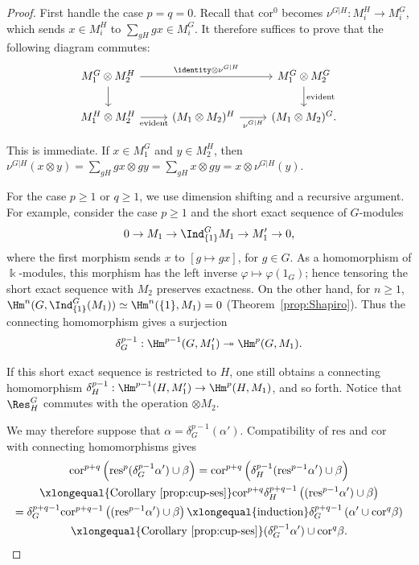 \begin{proof}
	First handle the case $p=q=0$. Recall that $\mathrm{cor}^0$ becomes
	$\nu^{G|H}:M_i^H\to M_i^G$, which sends $x\in M_i^H$ to
	$\sum_{gH}gx\in M_i^G$. It therefore suffices to prove that the following
	diagram commutes:
	\[\begin{tikzcd}
		M_1^G \otimes M_2^H \arrow[rr, "{\identity \otimes \nu^{G|H}}"] \arrow[d] & & M_1^G \otimes M_2^G \arrow[d, "\text{evident}"] \\
		M_1^H \otimes M_2^H \arrow[r, "\text{evident}"'] & (M_1 \otimes M_2)^H \arrow[r, "{\nu^{G|H}}"'] & (M_1 \otimes M_2)^G .
	\end{tikzcd}\]

	This is immediate. If $x\in M_1^G$ and $y\in M_2^H$, then
	$\nu^{G|H}(x\otimes y)=\sum_{gH}gx\otimes gy
	=\sum_{gH}x\otimes gy=x\otimes\nu^{G|H}(y)$.

	For the case $p\geq1$ or $q\geq1$, we use dimension shifting and a
	recursive argument. For example, consider the case $p\geq1$ and the short
	exact sequence of $G$-modules
	\[ 0 \to M_1 \to \Ind^G_{\{1\}} M_1 \to M'_1 \to 0, \]
	where the first morphism sends $x$ to $[g\mapsto gx]$, for $g\in G$. As a
	homomorphism of $\Bbbk$-modules, this morphism has the left inverse
	$\varphi\mapsto\varphi(1_G)$; hence tensoring the short exact sequence with
	$M_2$ preserves exactness. On the other hand, for $n\geq1$,
	$\Hm^n(G,\Ind^G_{\{1\}}(M_1))\simeq\Hm^n(\{1\},M_1)=0$
	(Theorem~\ref{prop:Shapiro}). Thus the connecting homomorphism gives a
	surjection
	\[ \delta_G^{p-1}: \Hm^{p-1}(G, M'_1) \twoheadrightarrow \Hm^p(G, M_1). \]

	If this short exact sequence is restricted to $H$, one still obtains a
	connecting homomorphism
	$\delta_H^{p-1}:\Hm^{p-1}(H,M'_1)\to\Hm^p(H,M_1)$, and so forth. Notice
	that $\Res^G_H$ commutes with the operation $\otimes M_2$.

	We may therefore suppose that
	$\alpha=\delta_G^{p-1}(\alpha')$. Compatibility of $\mathrm{res}$ and
	$\mathrm{cor}$ with connecting homomorphisms gives
	\begin{multline*}
		\mathrm{cor}^{p+q}\left( \mathrm{res}^p(\delta_G^{p-1} \alpha') \cup \beta \right) = \mathrm{cor}^{p+q}\left( \delta_H^{p-1} (\mathrm{res}^{p-1} \alpha') \cup \beta \right) \\
		\xlongequal{\text{Corollary \ref{prop:cup-ses}}} \mathrm{cor}^{p+q} \delta_H^{p+q-1} \left( (\mathrm{res}^{p-1} \alpha') \cup \beta \right) \\
		= \delta^{p+q-1}_G \mathrm{cor}^{p+q-1} \left( (\mathrm{res}^{p-1} \alpha') \cup \beta \right)
		\xlongequal{\text{induction}} \delta^{p+q-1}_G \left(\alpha' \cup \mathrm{cor}^q \beta\right) \\
		\xlongequal{\text{Corollary \ref{prop:cup-ses}}} (\delta^{p-1}_G \alpha') \cup \mathrm{cor}^q \beta .
	\end{multline*}


\end{proof}
